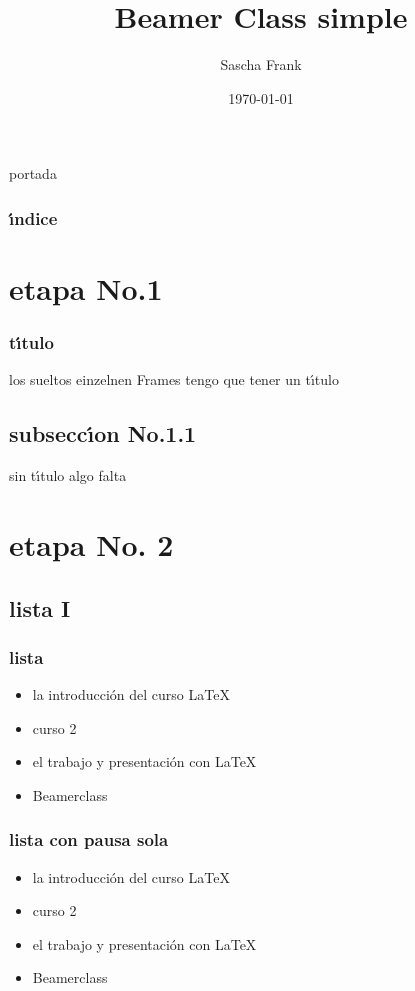 \documentclass[hyperref={pdfpagelabels=false}]{beamer}
\title{Beamer Class simple}
\author{Sascha Frank}
\date{\today}
\begin{document}
\begin{frame}
\titlepage portada
\end{frame} 

\begin{frame}
\frametitle{\'\i ndice}
\tableofcontents
\end{frame} 


\section{etapa No.1} 

\begin{frame}
\frametitle{t\'\i tulo} 
los sueltos einzelnen Frames tengo que tener un t\'\i tulo 
\end{frame}

\subsection{subsecc\'\i on No.1.1  }

\begin{frame} 
sin t\'\i tulo algo falta
\end{frame}


\section{etapa No. 2} 
\subsection{lista I}

\begin{frame}
\frametitle{lista}
\begin{itemize}
\item la introducci\'on del curso  \LaTeX{}  
\item curso 2  
\item el trabajo y presentaci\'on con  \LaTeX{} 
\item Beamerclass 
\end{itemize} 
\end{frame}

\begin{frame}
\frametitle{lista con pausa sola}
\begin{itemize}
\item la introducci\'on del curso  \LaTeX{}  \pause 
\item curso 2  \pause 
\item el trabajo y presentaci\'on con  \LaTeX{} \pause 
\item Beamerclass 
\end{itemize} 
\end{frame}
\end{document}

